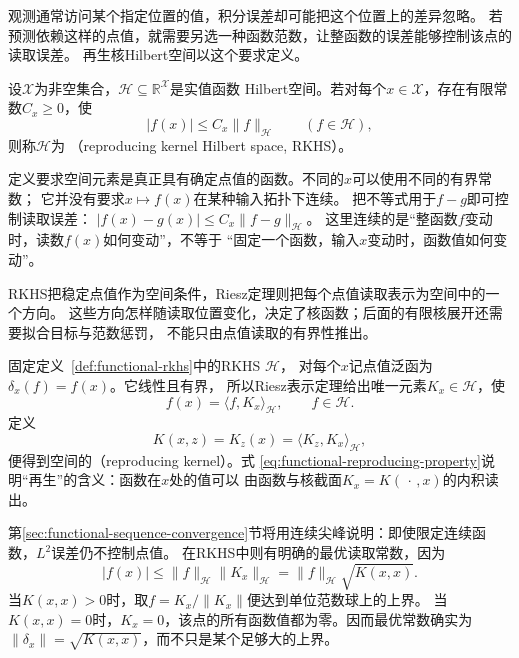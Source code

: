 观测通常访问某个指定位置的值，积分误差却可能把这个位置上的差异忽略。
若预测依赖这样的点值，就需要另选一种函数范数，让整函数的误差能够控制该点的读取误差。
再生核Hilbert空间以这个要求定义。
\begin{definition}[再生核Hilbert空间]
\label{def:functional-rkhs}
设$\mathcal X$为非空集合，$\mathcal H\subseteq\mathbb R^{\mathcal X}$是实值函数
Hilbert空间。若对每个$x\in\mathcal X$，存在有限常数$C_x\geq0$，使
\[
 |f(x)|\leq C_x\lVert f\rVert_{\mathcal H}\qquad(f\in\mathcal H),
\]
则称$\mathcal H$为
（reproducing kernel Hilbert space, RKHS）。
\end{definition}
定义要求空间元素是真正具有确定点值的函数。不同的$x$可以使用不同的有界常数；
它并没有要求$x\mapsto f(x)$在某种输入拓扑下连续。
把不等式用于$f-g$即可控制读取误差：
$|f(x)-g(x)|\leq C_x\lVert f-g\rVert_{\mathcal H}$。
这里连续的是“整函数$f$变动时，读数$f(x)$如何变动”，不等于
“固定一个函数，输入$x$变动时，函数值如何变动”。

RKHS把稳定点值作为空间条件，Riesz定理则把每个点值读取表示为空间中的一个方向。
这些方向怎样随读取位置变化，决定了核函数；后面的有限核展开还需要拟合目标与范数惩罚，
不能只由点值读取的有界性推出。

固定定义~\ref{def:functional-rkhs}中的RKHS $\mathcal H$，
对每个$x$记点值泛函为$\delta_x(f)=f(x)$。它线性且有界，
所以Riesz表示定理给出唯一元素$K_x\in\mathcal{H}$，使
\begin{equation}
  f(x)=\langle f,K_x\rangle_{\mathcal{H}},
  \qquad f\in\mathcal{H}.
  \label{eq:functional-reproducing-property}
\end{equation}
定义
\[
  K(x,z)=K_z(x)
  =\langle K_z,K_x\rangle_{\mathcal{H}},
\]
便得到空间的（reproducing kernel）。式
\eqref{eq:functional-reproducing-property}说明“再生”的含义：函数在$x$处的值可以
由函数与核截面$K_x=K(\,\cdot\,,x)$的内积读出。

第\ref{sec:functional-sequence-convergence}节将用连续尖峰说明：即使限定连续函数，$L^2$误差仍不控制点值。
在RKHS中则有明确的最优读取常数，因为
\begin{equation}
  |f(x)|
  \leq
  \lVert f\rVert_{\mathcal{H}}
  \lVert K_x\rVert_{\mathcal{H}}
  =
  \lVert f\rVert_{\mathcal{H}}\sqrt{K(x,x)}.
  \label{eq:functional-rkhs-pointwise-bound}
\end{equation}
当$K(x,x)>0$时，取$f=K_x/\lVert K_x\rVert$便达到单位范数球上的上界。
当$K(x,x)=0$时，$K_x=0$，该点的所有函数值都为零。因而最优常数确实为
$\lVert\delta_x\rVert=\sqrt{K(x,x)}$，而不只是某个足够大的上界。

